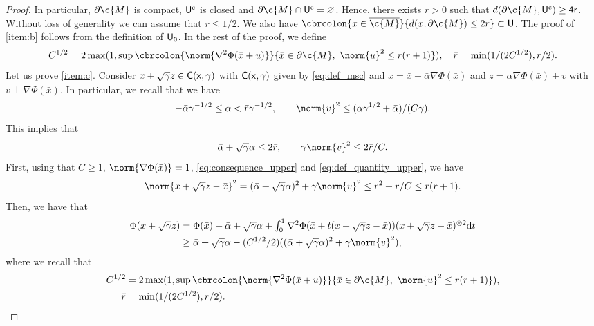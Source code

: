 \begin{proof}
	In particular, $\partial \c{M}$ is compact, $\sf{U}^\mathrm{c}$ is closed and $\partial \c{M} \cap \sf{U}^\mathrm{c} = \emptyset$.
	Hence, there exists $r > 0$ such that $d(\partial \c{M}, \sf{U}^\mathrm{c}) \geq 4r$.
	Without loss of generality we can assume that $r \leq 1/2$.
	We also have $\cbrcolon{x \in \cl{\c{M}}}{d(x, \partial \c{M}) \leq 2r } \subset \sf{U}$.
	The proof of \ref{item:b} follows from the definition of $\sf{U}_0$.
	In the rest of the proof, we define \begin{equation} \label{eq:def_quantity_upper} C^{1/2} = 2\max(1, \sup \cbrcolon{\norm{\nabla^2 \Phi(\bar{x} + u) }}{\bar{x} \in \partial \c{M}, \ \norm{u}^2 \leq r(r+1)}) , \quad \bar{r} = \min(1/(2C^{1/2}), r/2).
	\end{equation}
	Let us prove \ref{item:c}.
	Consider $x + \sqrt{\gamma} z \in \sf{C}(x,\gamma)$ with $\sf{C}(x,\gamma)$ given by \eqref{eq:def_msc} and $x = \bar{x} + \bar{\alpha} \nabla \Phi(\bar{x})$ and $z = \alpha \nabla \Phi(\bar{x}) + v$ with $v \perp \nabla \Phi(\bar{x})$.
	In particular, we recall that we have \begin{equation} -\bar{\alpha}\gamma^{-1/2} \leq \alpha < \bar{r} \gamma^{-1/2} , \qquad \norm{v}^2 \leq ( \alpha \gamma^{1/2} + \bar{\alpha})/(C\gamma) .
	\end{equation}
	This implies that \begin{equation} \label{eq:consequence_upper} \bar{\alpha} + \sqrt{\gamma} \alpha \leq 2 \bar{r} , \qquad \gamma \norm{v}^2 \leq 2 \bar{r} / C .
	\end{equation}
	First, using that $C \geq1$, $\norm{\nabla \Phi(\bar{x})}=1$, \eqref{eq:consequence_upper} and \eqref{eq:def_quantity_upper}, we have \begin{equation} \norm{x+\sqrt{\gamma}z - \bar{x}}^2 = (\bar{\alpha} + \sqrt{\gamma}\alpha)^2 + \gamma \norm{v}^2 \leq r^2 + r/C \leq r(r+1) .
	\end{equation}
	Then, we have that \begin{align} \Phi(x+\sqrt{\gamma}z) &= \textstyle{\Phi(\bar{x}) + \bar{\alpha} + \sqrt{\gamma} \alpha + \int_0^1 \nabla^2 \Phi(\bar{x}+t(x+\sqrt{\gamma}z-\bar{x}))(x+\sqrt{\gamma}z-\bar{x})^{\otimes 2} \mathrm{d} t } \\ & \geq \bar{\alpha} + \sqrt{\gamma} \alpha - (C^{1/2}/2) ((\bar{\alpha} + \sqrt{\gamma} \alpha)^2 + \gamma \norm{v}^2) , \end{align} where we recall that \begin{align} C^{1/2} &= 2\max(1, \sup \cbrcolon{\norm{\nabla^2 \Phi(\bar{x} + u) }}{\bar{x} \in \partial \c{M}, \ \norm{u}^2 \leq r(r+1)}), \\ \bar{r} &= \min(1/(2C^{1/2}), r/2).

\end{align}
\end{proof}
